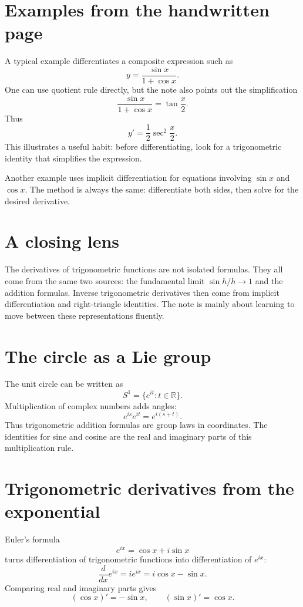 \section{Examples from the handwritten page}

A typical example differentiates a composite expression such as
\[
  y=\frac{\sin x}{1+\cos x}.
\]
One can use quotient rule directly, but the note also points out the simplification
\[
  \frac{\sin x}{1+\cos x}=\tan\frac x2.
\]
Thus
\[
  y'=\frac12\sec^2\frac x2.
\]
This illustrates a useful habit: before differentiating, look for a trigonometric identity that simplifies the expression.

Another example uses implicit differentiation for equations involving $\sin x$ and $\cos x$.  The method is always the same: differentiate both sides, then solve for the desired derivative.

\section{A closing lens}

The derivatives of trigonometric functions are not isolated formulas.  They all come from the same two sources: the fundamental limit $\sin h/h\to1$ and the addition formulas.  Inverse trigonometric derivatives then come from implicit differentiation and right-triangle identities.  The note is mainly about learning to move between these representations fluently.

\section{The circle as a Lie group}

The unit circle can be written as
\[
  S^1=\{e^{it}:t\in\mathbb R\}.
\]
Multiplication of complex numbers adds angles:
\[
  e^{is}e^{it}=e^{i(s+t)}.
\]
Thus trigonometric addition formulas are group laws in coordinates.  The identities for sine and cosine are the real and imaginary parts of this multiplication rule.

\section{Trigonometric derivatives from the exponential}

Euler's formula
\[
  e^{ix}=\cos x+i\sin x
\]
turns differentiation of trigonometric functions into differentiation of \(e^{ix}\):
\[
  \frac d{dx}e^{ix}=ie^{ix}=i\cos x-\sin x.
\]
Comparing real and imaginary parts gives
\[
  (\cos x)'=-\sin x,\qquad (\sin x)'=\cos x.
\]

